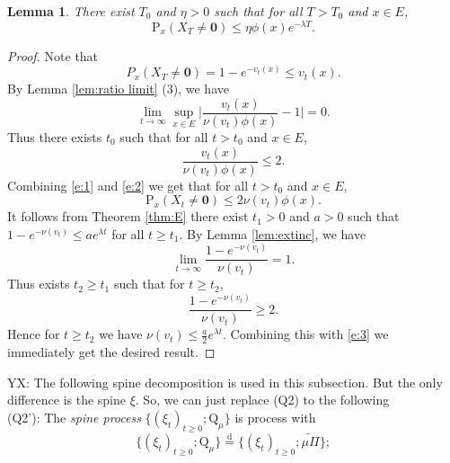 \documentclass[12pt,a4paper]{amsart}
\numberwithin{equation}{section}
\theoremstyle{plain}
\newtheorem{lem}[thm]{Lemma}
\theoremstyle{definition}
\theoremstyle{remark}
\begin{document}
\begin{lem}\label{l:new}
There exist $T_0$ and $\eta>0$ such that for all $T>T_0$ and $x\in E$,
$$
\mathrm P_x (X_T\neq\mathbf 0)\le \eta\phi(x)e^{-\lambda T}.
$$
\end{lem}
\begin{proof}
Note that
\begin{equation}\label{e:1}
P_x (X_T\neq\mathbf 0)=1-e^{-v_t(x)}\le v_t(x).
\end{equation}
By Lemma \ref{lem:ratio limit} (3), we have
$$
\lim_{t\to\infty}\sup_{x\in E}\Big|\frac{v_t(x)}{\nu(v_t)\phi(x)}-1\Big|=0.
$$
Thus there exists $t_0$ such that for all $t>t_0$ and $x\in E$,
\begin{equation}\label{e:2}
\frac{v_t(x)}{\nu(v_t)\phi(x)}\le 2.
\end{equation}
Combining \eqref{e:1} and \eqref{e:2} we get that  for all $t>t_0$ and $x\in E$,
\begin{equation}\label{e:3}
\mathrm P_x (X_t\neq\mathbf 0)\le 2 \nu(v_t)\phi(x).
\end{equation}
It follows from Theorem \ref{thm:E} there exist $t_1>0$ and $a>0$ such that
$1-e^{-\nu(v_t)}\le a e^{\lambda t}$ for all $t\ge t_1$. By Lemma \ref{lem:extinc},
we have
$$
\lim_{t\to\infty}\frac{1-e^{-\nu(v_t)}}{\nu(v_t)}=1.
$$
Thus exists $t_2\ge t_1$ such that for $t\ge t_2$,
$$
\frac{1-e^{-\nu(v_t)}}{\nu(v_t)}\ge 2.
$$
Hence for $t\ge t_2$ we have $\nu(v_t)\le\frac{a}2e^{\lambda t}$.
Combining this with \eqref{e:3} we immediately get the desired result.
\end{proof}

{\color{red} YX: The following spine decomposition is used in this subsection. But the only difference is the spine $\xi$. So, we can just replace (Q2) to the following\\
(Q2'): The \emph{spine process} $\{(\xi_t)_{t\geq 0}; \mathrm Q_\mu\}$ is process with
 \[\{(\xi_t)_{t \geq 0}; \mathrm Q_\mu\} \overset{\text{d}} = \{(\xi_t)_{t \geq 0}; \widetilde{\mu\Pi}\};\]
 }
\end{document}
